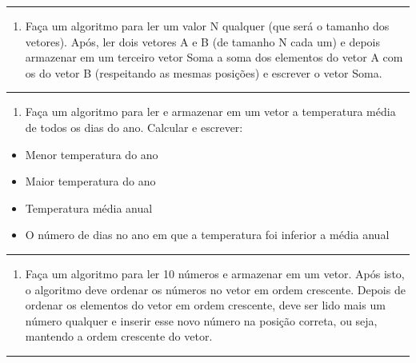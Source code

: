 \documentclass[12pt,a4paper]{article}
\providecommand{\tightlist}{%
      \setlength{\itemsep}{0pt}\setlength{\parskip}{0pt}}
\begin{document}
    \begin{center}\rule{0.5\linewidth}{0.5pt}\end{center}

\begin{enumerate}
\def\labelenumi{\arabic{enumi}.}
\setcounter{enumi}{7}
\tightlist
\item
  Faça um algoritmo para ler um valor N qualquer (que será o tamanho dos
  vetores). Após, ler dois vetores A e B (de tamanho N cada um) e depois
  armazenar em um terceiro vetor Soma a soma dos elementos do vetor A
  com os do vetor B (respeitando as mesmas posições) e escrever o vetor
  Soma.
\end{enumerate}

    \begin{center}\rule{0.5\linewidth}{0.5pt}\end{center}

\begin{enumerate}
\def\labelenumi{\arabic{enumi}.}
\setcounter{enumi}{8}
\tightlist
\item
  Faça um algoritmo para ler e armazenar em um vetor a temperatura média
  de todos os dias do ano. Calcular e escrever:
\end{enumerate}

\begin{itemize}
\tightlist
\item
  Menor temperatura do ano
\item
  Maior temperatura do ano
\item
  Temperatura média anual
\item
  O número de dias no ano em que a temperatura foi inferior a média
  anual
\end{itemize}

    \begin{center}\rule{0.5\linewidth}{0.5pt}\end{center}

\begin{enumerate}
\def\labelenumi{\arabic{enumi}.}
\setcounter{enumi}{9}
\tightlist
\item
  Faça um algoritmo para ler 10 números e armazenar em um vetor. Após
  isto, o algoritmo deve ordenar os números no vetor em ordem crescente.
  Depois de ordenar os elementos do vetor em ordem crescente, deve ser
  lido mais um número qualquer e inserir esse novo número na posição
  correta, ou seja, mantendo a ordem crescente do vetor.
\end{enumerate}

    \begin{center}\rule{0.5\linewidth}{0.5pt}\end{center}
\end{document}
